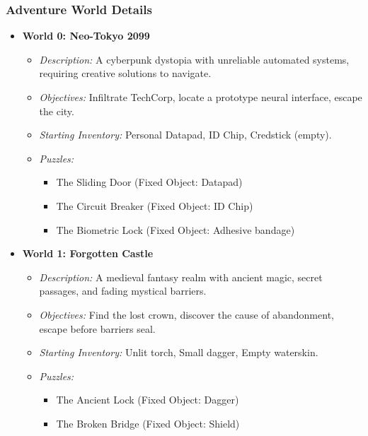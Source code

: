 \documentclass{article}
\begin{document}
\begin{itemize}
        \subsubsection{Adventure World Details}
        \begin{itemize}
            \item \textbf{World 0: Neo-Tokyo 2099}
                \begin{itemize}
                    \item \textit{Description:} A cyberpunk dystopia with unreliable automated systems, requiring creative solutions to navigate.
                    \item \textit{Objectives:} Infiltrate TechCorp, locate a prototype neural interface, escape the city.
                    \item \textit{Starting Inventory:} Personal Datapad, ID Chip, Credstick (empty).
                    \item \textit{Puzzles:}
                        \begin{itemize}
                            \item The Sliding Door (Fixed Object: Datapad)
                            \item The Circuit Breaker (Fixed Object: ID Chip)
                            \item The Biometric Lock (Fixed Object: Adhesive bandage)
                        \end{itemize}
                \end{itemize}
            \item \textbf{World 1: Forgotten Castle}
                \begin{itemize}
                    \item \textit{Description:} A medieval fantasy realm with ancient magic, secret passages, and fading mystical barriers.
                    \item \textit{Objectives:} Find the lost crown, discover the cause of abandonment, escape before barriers seal.
                    \item \textit{Starting Inventory:} Unlit torch, Small dagger, Empty waterskin.
                    \item \textit{Puzzles:}
                        \begin{itemize}
                            \item The Ancient Lock (Fixed Object: Dagger)
                            \item The Broken Bridge (Fixed Object: Shield)

\end{itemize}
\end{itemize}
\end{itemize}
\end{itemize}
\end{document}
